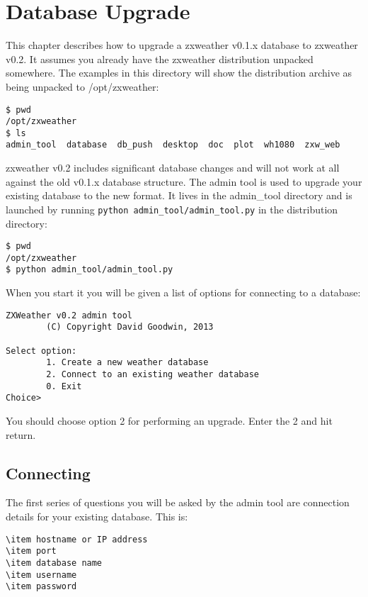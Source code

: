 \documentclass[a4paper,10pt,draft]{book}
\begin{document}
\chapter{Database Upgrade}
This chapter describes how to upgrade a zxweather v0.1.x database to zxweather v0.2. It assumes you already have the zxweather distribution unpacked somewhere. The examples in this directory will show the distribution archive as being unpacked to /opt/zxweather:
\begin{verbatim}
$ pwd
/opt/zxweather
$ ls
admin_tool  database  db_push  desktop  doc  plot  wh1080  zxw_web
\end{verbatim}

zxweather v0.2 includes significant database changes and will not work at all against the old v0.1.x database structure. The admin tool is used to upgrade your existing database to the new format. It lives in the admin\_tool directory and is launched by running \verb|python admin_tool/admin_tool.py| in the distribution directory:

\begin{verbatim}
$ pwd
/opt/zxweather
$ python admin_tool/admin_tool.py
\end{verbatim}

When you start it you will be given a list of options for connecting to a database:
\begin{verbatim}
ZXWeather v0.2 admin tool
        (C) Copyright David Goodwin, 2013

Select option:
        1. Create a new weather database
        2. Connect to an existing weather database
        0. Exit
Choice>
\end{verbatim}

You should choose option 2 for performing an upgrade. Enter the 2 and hit return.

\section{Connecting}
The first series of questions you will be asked by the admin tool are connection details for your existing database. This is:
\begin{verbatim}
\item hostname or IP address
\item port
\item database name
\item username
\item password
\end{verbatim}
\end{document}
